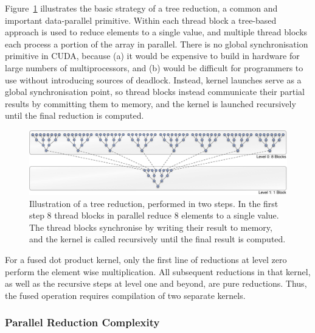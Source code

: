 Figure~\ref{fig:tree_reduction} illustrates the basic strategy of a tree
reduction, a common and important data-parallel primitive. Within each thread
block a tree-based approach is used to reduce elements to a single value, and
multiple thread blocks each process a portion of the array in parallel. There is
no global synchronisation primitive in CUDA, because (a) it would be expensive
to build in hardware for large numbers of multiprocessors, and (b) would be
difficult for programmers to use without introducing sources of deadlock.
Instead, kernel launches serve as a global synchronisation point, so thread
blocks instead communicate their partial results by committing them to memory,
and the kernel is launched recursively until the final reduction is computed.

\begin{figure}[htbp]
    \begin{center}
        \includegraphics[width=\textwidth]{images/sec-6/tree-reduction}
    \end{center}
    \caption[A parallel tree reduction]{Illustration of a tree reduction,
        performed in two steps. In the first step 8 thread blocks in parallel
        reduce 8 elements to a single value. The thread blocks synchronise by
        writing their result to memory, and the kernel is called recursively
        until the final result is computed.}
    \label{fig:tree_reduction}
\end{figure}

For a fused dot product kernel, only the first line of reductions at level zero
perform the element wise multiplication. All subsequent reductions in that
kernel, as well as the recursive steps at level one and beyond, are pure
reductions. Thus, the fused operation requires compilation of two separate
kernels. %

\subsubsection{Parallel Reduction Complexity}
\label{sec:parallel_complexity}

